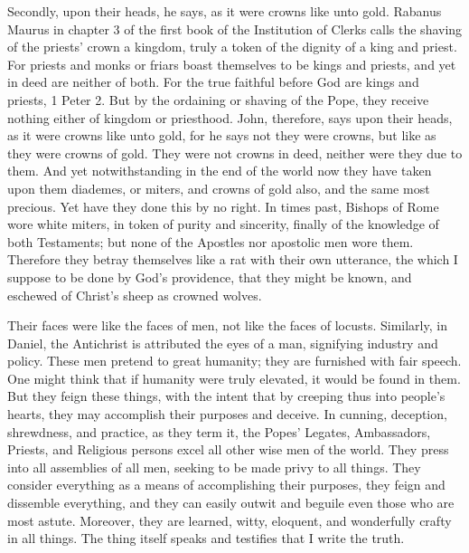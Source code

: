 Secondly, upon their heads, he says, as it were crowns like unto gold. Rabanus Maurus in chapter 3 of the first book of the Institution of Clerks calls the shaving of the priests’ crown a kingdom, truly a token of the dignity of a king and priest. For priests and monks or friars boast themselves to be kings and priests, and yet in deed are neither of both. For the true faithful before God are kings and priests, 1 Peter 2. But by the ordaining or shaving of the Pope, they receive nothing either of kingdom or priesthood. John, therefore, says upon their heads, as it were crowns like unto gold, for he says not they were crowns, but like as they were crowns of gold. They were not crowns in deed, neither were they due to them. And yet notwithstanding in the end of the world now they have taken upon them diademes, or miters, and crowns of gold also, and the same most precious. Yet have they done this by no right. In times past, Bishops of Rome wore white miters, in token of purity and sincerity, finally of the knowledge of both Testaments; but none of the Apostles nor apostolic men wore them. Therefore they betray themselves like a rat with their own utterance, the which I suppose to be done by God’s providence, that they might be known, and eschewed of Christ's sheep as crowned wolves.

Their faces were like the faces of men, not like the faces of locusts. Similarly, in Daniel, the Antichrist is attributed the eyes of a man, signifying industry and policy. These men pretend to great humanity; they are furnished with fair speech. One might think that if humanity were truly elevated, it would be found in them. But they feign these things, with the intent that by creeping thus into people's hearts, they may accomplish their purposes and deceive. In cunning, deception, shrewdness, and practice, as they term it, the Popes’ Legates, Ambassadors, Priests, and Religious persons excel all other wise men of the world. They press into all assemblies of all men, seeking to be made privy to all things. They consider everything as a means of accomplishing their purposes, they feign and dissemble everything, and they can easily outwit and beguile even those who are most astute. Moreover, they are learned, witty, eloquent, and wonderfully crafty in all things. The thing itself speaks and testifies that I write the truth.

